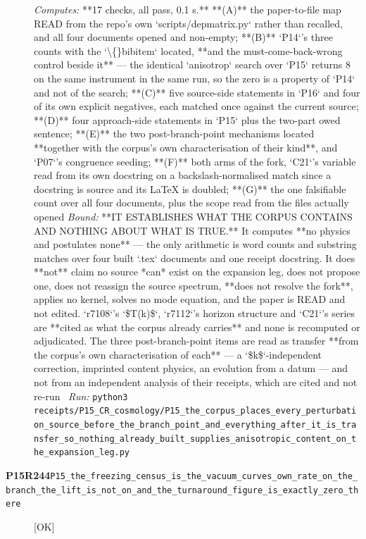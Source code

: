 \begin{description}
\emph{Computes:} **17 checks, all pass, 0.1 s.** **(A)** the paper-to-file map READ from the repo's own `scripts/depmatrix.py` rather than recalled, and all four documents opened and non-empty; **(B)** `P14`'s three counts with the `\textbackslash\{\}bibitem` located, **and the must-come-back-wrong control beside it** --- the identical `anisotrop` search over `P15` returns 8 on the same instrument in the same run, so the zero is a property of `P14` and not of the search; **(C)** five source-side statements in `P16` and four of its own explicit negatives, each matched once against the current source; **(D)** four approach-side statements in `P15` plus the two-part owed sentence; **(E)** the two post-branch-point mechanisms located **together with the corpus's own characterisation of their kind**, and `P07`'s congruence seeding; **(F)** both arms of the fork, `C21`'s variable read from its own docstring on a backslash-normalised match since a docstring is source and its LaTeX is doubled; **(G)** the one falsifiable count over all four documents, plus the scope read from the files actually opened
 \emph{Bound:}  **IT ESTABLISHES WHAT THE CORPUS CONTAINS AND NOTHING ABOUT WHAT IS TRUE.**  It computes **no physics and postulates none** --- the only arithmetic is word counts and substring matches over four built `.tex` documents and one receipt docstring. It does **not** claim no source *can* exist on the expansion leg, does not propose one, does not reassign the source spectrum, **does not resolve the fork**, applies no kernel, solves no mode equation, and the paper is READ and not edited. `r7108`'s `\$T(k)\$`, `r7112`'s horizon structure and `C21`'s series are **cited as what the corpus already carries** and none is recomputed or adjudicated.  The three post-branch-point items are read as transfer **from the corpus's own characterisation of each** --- a `\$k\$`-independent correction, imprinted content physics, an evolution from a datum --- and not from an independent analysis of their receipts, which are cited and not re-run
\ \emph{Run:} \texttt{python3 receipts/P15\_CR\_cosmology/P15\_the\_corpus\_places\_every\_perturbation\_source\_before\_the\_branch\_point\_and\_everything\_after\_it\_is\_transfer\_so\_nothing\_already\_built\_supplies\_anisotropic\_content\_on\_the\_expansion\_leg.py}
\item[\rcptlabel{P15_the_freezing_census_is_the_vacuum_curves_own_rate_on_the_branch_the_lift_is_not_on_and_the_turnaround_figure_is_exactly_zero_there}{P15R244}\textbf{P15R244}\quad\texttt{P15\_the\_freezing\_census\_is\_the\_vacuum\_curves\_own\_rate\_on\_the\_branch\_the\_lift\_is\_not\_on\_and\_the\_turnaround\_figure\_is\_exactly\_zero\_there}]\hfill\textsf{[OK]}\\

\end{description}
